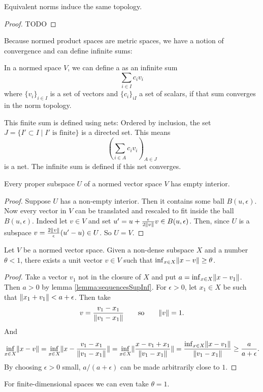 \begin{proposition}
Equivalent norms induce the same topology.
\end{proposition}
\begin{proof}
TODO
\end{proof}

Because normed product spaces are metric spaces, we have a notion of convergence and can define infinite sums:
\begin{definition}
In a normed space $V$, we can define a  as an infinite sum
\[ \sum_{i\in I} c_i v_i  \]
where $\{v_i\}_{i\in I}$ is a set of vectors and $\{c_i\}_{i I}$ a set of scalars, if that sum converges in the norm topology.
\end{definition}
\begin{note}
This finite sum is defined using nets:
Ordered by inclusion, the set $J = \{I'\subset I \;|\; I' \; \text{is finite}\}$ is a directed set. This means
\[ \left(\sum_{i\in A}c_iv_i \right)_{A\in J} \]
is a net. The infinite sum is defined if this net converges.
\end{note}

\begin{lemma}
Every proper subspace $U$ of a normed vector space $V$ has empty interior.
\end{lemma}
\begin{proof}
Suppose $U$ has a non-empty interior. Then it contains some ball $B(u,\epsilon)$. Now every vector in $V$ can be translated and rescaled to fit inside the ball $B(u,\epsilon)$. Indeed let $v\in V$ and set $u' = u+ \frac{\epsilon}{2\lVert v\rVert}v \in B(u,\epsilon)$. Then, since $U$ is a subspace $v = \frac{2\lVert v\rVert}{\epsilon}(u'-u)\in U$. So $U=V$.
\end{proof}

\begin{lemma} \label{lemma:RieszsLemma}
Let $V$ be a normed vector space. Given a non-dense subspace $X$ and a number $\theta<1$, there exists a unit vector $v\in V$ such that $\inf_{x\in X}\lVert x-v\rVert\geq \theta$.
\end{lemma}
\begin{proof}
Take a vector $v_1$ not in the closure of $X$ and put $a = \inf_{x\in X}\lVert x-v_1\rVert$. Then $a>0$ by lemma \ref{lemma:sequencesSupInf}. For $\epsilon > 0$, let $x_1\in X$ be such that $\lVert x_1+v_1\rVert<a+\epsilon$. Then take
\[ v = \frac{v_1 - x_1}{\lVert v_1-x_1\rVert} \qquad \text{so} \qquad \lVert v\rVert=1. \]
And
\[ \inf_{x\in X}\lVert x-v\rVert = \inf_{x\in X}\lVert x-\frac{v_1 - x_1}{\lVert v_1-x_1\rVert}\rVert = \inf_{x\in X}\lVert\frac{x-v_1 + x_1}{\lVert v_1-x_1\rVert}\rVert = \frac{\inf_{x\in X}\lVert x-v_1\rVert}{\lVert v_1-x_1\rVert} \geq \frac{a}{a+\epsilon}. \]
By choosing $\epsilon >0$ small, $a/(a+\epsilon)$ can be made arbitrarily close to $1$.
\end{proof}
For finite-dimensional spaces we can even take $\theta=1$.

